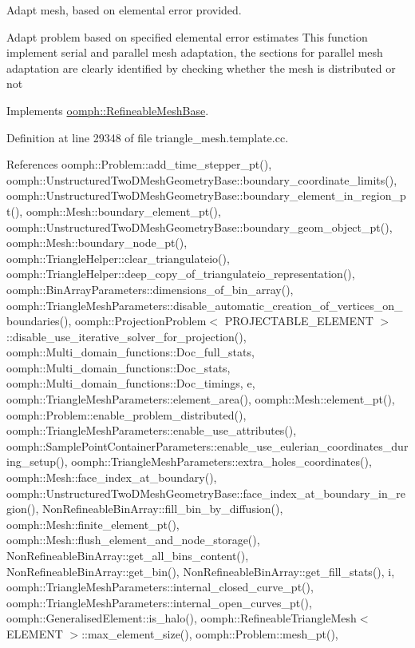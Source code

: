 Adapt mesh, based on elemental error provided. 

Adapt problem based on specified elemental error estimates This function implement serial and parallel mesh adaptation, the sections for parallel mesh adaptation are clearly identified by checking whether the mesh is distributed or not 

Implements \hyperlink{classoomph_1_1RefineableMeshBase_aabe38fc56f2f12e91f2a2e8a4cf663b0}{oomph\+::\+Refineable\+Mesh\+Base}.



Definition at line 29348 of file triangle\+\_\+mesh.\+template.\+cc.



References oomph\+::\+Problem\+::add\+\_\+time\+\_\+stepper\+\_\+pt(), oomph\+::\+Unstructured\+Two\+D\+Mesh\+Geometry\+Base\+::boundary\+\_\+coordinate\+\_\+limits(), oomph\+::\+Unstructured\+Two\+D\+Mesh\+Geometry\+Base\+::boundary\+\_\+element\+\_\+in\+\_\+region\+\_\+pt(), oomph\+::\+Mesh\+::boundary\+\_\+element\+\_\+pt(), oomph\+::\+Unstructured\+Two\+D\+Mesh\+Geometry\+Base\+::boundary\+\_\+geom\+\_\+object\+\_\+pt(), oomph\+::\+Mesh\+::boundary\+\_\+node\+\_\+pt(), oomph\+::\+Triangle\+Helper\+::clear\+\_\+triangulateio(), oomph\+::\+Triangle\+Helper\+::deep\+\_\+copy\+\_\+of\+\_\+triangulateio\+\_\+representation(), oomph\+::\+Bin\+Array\+Parameters\+::dimensions\+\_\+of\+\_\+bin\+\_\+array(), oomph\+::\+Triangle\+Mesh\+Parameters\+::disable\+\_\+automatic\+\_\+creation\+\_\+of\+\_\+vertices\+\_\+on\+\_\+boundaries(), oomph\+::\+Projection\+Problem$<$ P\+R\+O\+J\+E\+C\+T\+A\+B\+L\+E\+\_\+\+E\+L\+E\+M\+E\+N\+T $>$\+::disable\+\_\+use\+\_\+iterative\+\_\+solver\+\_\+for\+\_\+projection(), oomph\+::\+Multi\+\_\+domain\+\_\+functions\+::\+Doc\+\_\+full\+\_\+stats, oomph\+::\+Multi\+\_\+domain\+\_\+functions\+::\+Doc\+\_\+stats, oomph\+::\+Multi\+\_\+domain\+\_\+functions\+::\+Doc\+\_\+timings, e, oomph\+::\+Triangle\+Mesh\+Parameters\+::element\+\_\+area(), oomph\+::\+Mesh\+::element\+\_\+pt(), oomph\+::\+Problem\+::enable\+\_\+problem\+\_\+distributed(), oomph\+::\+Triangle\+Mesh\+Parameters\+::enable\+\_\+use\+\_\+attributes(), oomph\+::\+Sample\+Point\+Container\+Parameters\+::enable\+\_\+use\+\_\+eulerian\+\_\+coordinates\+\_\+during\+\_\+setup(), oomph\+::\+Triangle\+Mesh\+Parameters\+::extra\+\_\+holes\+\_\+coordinates(), oomph\+::\+Mesh\+::face\+\_\+index\+\_\+at\+\_\+boundary(), oomph\+::\+Unstructured\+Two\+D\+Mesh\+Geometry\+Base\+::face\+\_\+index\+\_\+at\+\_\+boundary\+\_\+in\+\_\+region(), Non\+Refineable\+Bin\+Array\+::fill\+\_\+bin\+\_\+by\+\_\+diffusion(), oomph\+::\+Mesh\+::finite\+\_\+element\+\_\+pt(), oomph\+::\+Mesh\+::flush\+\_\+element\+\_\+and\+\_\+node\+\_\+storage(), Non\+Refineable\+Bin\+Array\+::get\+\_\+all\+\_\+bins\+\_\+content(), Non\+Refineable\+Bin\+Array\+::get\+\_\+bin(), Non\+Refineable\+Bin\+Array\+::get\+\_\+fill\+\_\+stats(), i, oomph\+::\+Triangle\+Mesh\+Parameters\+::internal\+\_\+closed\+\_\+curve\+\_\+pt(), oomph\+::\+Triangle\+Mesh\+Parameters\+::internal\+\_\+open\+\_\+curves\+\_\+pt(), oomph\+::\+Generalised\+Element\+::is\+\_\+halo(), oomph\+::\+Refineable\+Triangle\+Mesh$<$ E\+L\+E\+M\+E\+N\+T $>$\+::max\+\_\+element\+\_\+size(), oomph\+::\+Problem\+::mesh\+\_\+pt(), 